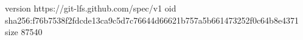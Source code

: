 version https://git-lfs.github.com/spec/v1
oid sha256:f76b7538f2fdcde13ca9c5d7c76644d66621b757a5b661473252f0c64b8e4371
size 87540

